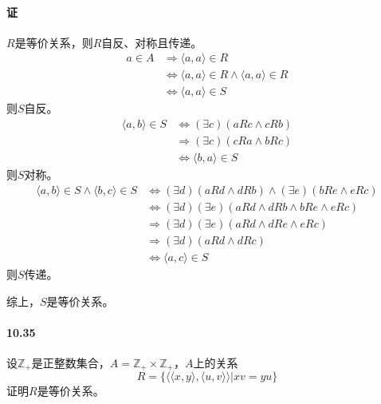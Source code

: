 \documentclass[UTF8]{ctexart}
\newcommand{\sinteger}{\mathbb{Z}}
\begin{document}
\paragraph{证}
    $R$是等价关系，则$R$自反、对称且传递。
    \begin{align*}
        a \in A & \Longrightarrow \langle a,a \rangle \in R \\
        & \Longleftrightarrow \langle a,a \rangle \in R \land \langle a,a \rangle \in R \\
        & \Longleftrightarrow \langle a,a \rangle \in S
    \end{align*}
    则$S$自反。
    \begin{align*}
        \langle a,b \rangle \in S & \Longleftrightarrow ( \exists c)(aRc \land cRb) \\
        & \Longrightarrow ( \exists c)(cRa \land bRc) \\
        & \Longleftrightarrow \langle b,a \rangle \in S
    \end{align*}
    则$S$对称。
    \begin{align*}
        \langle a,b \rangle \in S \land \langle b,c \rangle \in S & \Longleftrightarrow ( \exists d)(aRd \land dRb) \land ( \exists e)(bRe \land eRc) \\
        & \Longleftrightarrow ( \exists d) ( \exists e)(aRd \land dRb \land bRe \land eRc) \\
        & \Longrightarrow ( \exists d) ( \exists e)(aRd \land dRe \land eRc) \\
        & \Longrightarrow ( \exists d)(a Rd \land dRc) \\
        & \Longleftrightarrow \langle a,c \rangle \in S
    \end{align*}
    则$S$传递。
    
    综上，$S$是等价关系。

\paragraph{10.35} \label{10.35}
    设$\sinteger_+$是正整数集合，$A = \sinteger_+ \times \sinteger_+$，$A$上的关系
    $$R= \{ \langle \langle x,y \rangle , \langle u,v \rangle \rangle | xv = yu \} $$
    证明$R$是等价关系。
\end{document}

